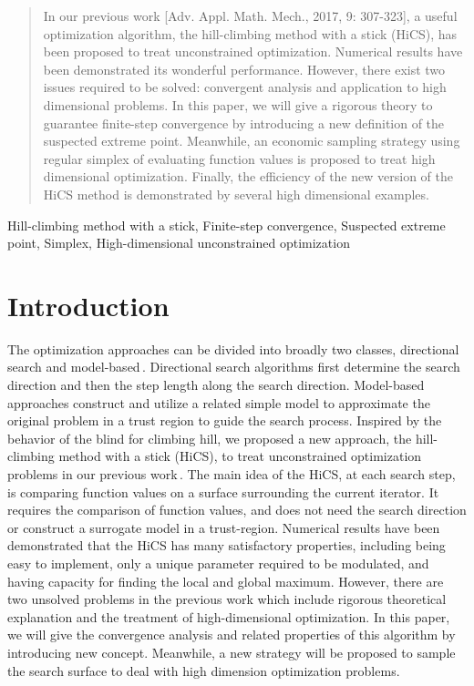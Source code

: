 \documentclass[final,1p,times]{elsarticle}
\begin{document}
\begin{frontmatter}
\begin{abstract}
In our previous work [Adv. Appl. Math. Mech., 2017, 9: 307-323], a useful
optimization algorithm, the hill-climbing method with a stick (HiCS), has
been proposed to treat unconstrained optimization. Numerical
results have been demonstrated its wonderful performance.
However, there exist two issues required to be solved: convergent
analysis and application to high dimensional problems. 
In this paper, we will give a rigorous theory to guarantee finite-step
convergence by introducing a new definition of the suspected
extreme point. Meanwhile, an economic sampling
strategy using regular simplex of evaluating function values is
proposed to treat high dimensional optimization. Finally, 
the efficiency of the new version of the HiCS method is demonstrated by several
high dimensional examples.
\end{abstract}

\begin{keyword}
Hill-climbing method with a stick, Finite-step convergence,
Suspected extreme point, Simplex, 
High-dimensional unconstrained optimization
\end{keyword}

\end{frontmatter}


\section{Introduction}
\label{sec:intro}

The optimization approaches can be divided into broadly two
classes, directional search and
model-based\,\cite{sun2006optimization, nocedal2006numerical,
conn2009introduction}.
Directional search algorithms first determine the search
direction and then the step length along the search
direction. Model-based approaches construct and utilize a related simple
model to approximate the original problem in a trust region to
guide the search process. 
Inspired by the behavior of the blind for climbing hill, we
proposed a new approach, the hill-climbing method with a stick
(HiCS), to treat unconstrained optimization problems in
our previous work\,\cite{huang2017hill}.
The main idea of the HiCS, at each search step, is comparing
function values on a surface surrounding the current iterator.
It requires the comparison of function values, and
does not need the search direction or construct a surrogate
model in a trust-region.
Numerical results have been demonstrated that the HiCS has many 
satisfactory properties, including being easy to implement,
only a unique parameter required to be modulated, and having capacity
for finding the local and global maximum. 
However, there are two unsolved problems in the
previous work which include rigorous theoretical explanation and
the treatment of high-dimensional optimization.
In this paper, we will give the convergence analysis and related
properties of this algorithm by introducing new concept. 
Meanwhile, a new strategy will be proposed to sample the search
surface to deal with high dimension optimization problems.
\end{document}
